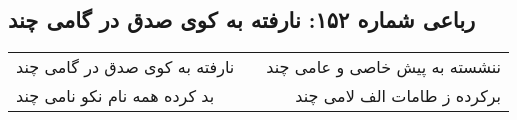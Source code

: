 \begin{center}
\section*{رباعی شماره ۱۵۲: نارفته به کوی صدق در گامی چند}
\label{sec:sh152}
\begin{longtable}{l p{0.5cm} r}
نارفته به کوی صدق در گامی چند
&&
ننشسته به پیش خاصی و عامی چند
\\
بد کرده همه نام نکو نامی چند
&&
برکرده ز طامات الف لامی چند
\\
\end{longtable}
\end{center}
